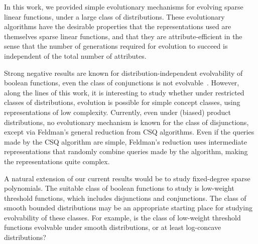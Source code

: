 In this work, we provided simple evolutionary mechanisms for evolving sparse
linear functions, under a large class of distributions. These evolutionary
algorithms have the desirable properties that the representations used are
themselves sparse linear functions, and that they are attribute-efficient in the
sense that the number of generations required for evolution to succeed is
independent of the total number of attributes.

Strong negative results are known for distribution-independent evolvability of
boolean functions, \eg even the class of conjunctions is not
evolvable~\cite{Feldman:2011-LTF}. However, along the lines of this work, it is
interesting to study whether under restricted classes of distributions,
evolution is possible for simple concept classes, using representations of low
complexity. Currently, even under (biased) product distributions, no
evolutionary mechanism is known for the class of disjunctions, except via
Feldman's general reduction from CSQ algorithms. Even if the queries made by the
CSQ algorithm are simple, Feldman's reduction uses intermediate representations
that randomly combine queries made by the algorithm, making the representations
quite complex.

A natural extension of our current results would be to study fixed-degree sparse
polynomials. The suitable class of boolean functions to study is low-weight
threshold functions, which includes disjunctions and conjunctions. The class of
smooth bounded distributions may be an appropriate starting place for studying
evolvability of these classes. For example, is the class of low-weight threshold
functions evolvable under smooth distributions, or at least log-concave
distributions? 
